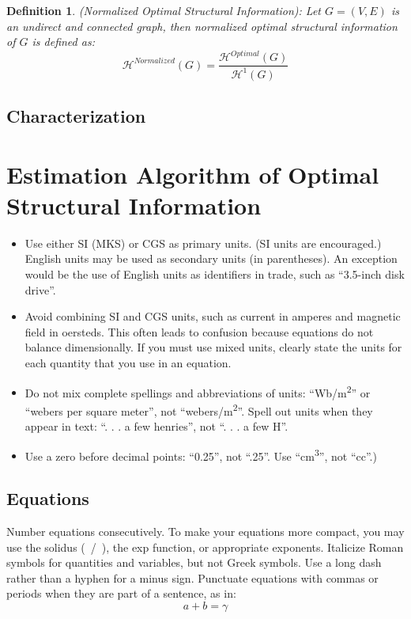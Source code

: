 \documentclass[10pt, conference, letterpaper]{IEEEtran}
\newtheorem{definition}{Definition}
\begin{document}
\begin{definition}
	(Normalized Optimal Structural Information): Let $G=(V,E)$ is an undirect and connected graph, then normalized optimal structural information of $G$ is defined as:
	\begin{equation}
	\label{eq:normalized_optimal_information}
	\mathcal{H}^{Normalized}(G)=\frac{\mathcal{H}^{Optimal}(G)}{\mathcal{H}^{1}(G)}
	\end{equation} 
\end{definition}

\subsection{Characterization}


\section{Estimation Algorithm of Optimal Structural Information}


\begin{itemize}
\item Use either SI (MKS) or CGS as primary units. (SI units are encouraged.) English units may be used as secondary units (in parentheses). An exception would be the use of English units as identifiers in trade, such as ``3.5-inch disk drive''.
\item Avoid combining SI and CGS units, such as current in amperes and magnetic field in oersteds. This often leads to confusion because equations do not balance dimensionally. If you must use mixed units, clearly state the units for each quantity that you use in an equation.
\item Do not mix complete spellings and abbreviations of units: ``Wb/m\textsuperscript{2}'' or ``webers per square meter'', not ``webers/m\textsuperscript{2}''. Spell out units when they appear in text: ``. . . a few henries'', not ``. . . a few H''.
\item Use a zero before decimal points: ``0.25'', not ``.25''. Use ``cm\textsuperscript{3}'', not ``cc''.)
\end{itemize}

\subsection{Equations}
Number equations consecutively. To make your 
equations more compact, you may use the solidus (~/~), the exp function, or 
appropriate exponents. Italicize Roman symbols for quantities and variables, 
but not Greek symbols. Use a long dash rather than a hyphen for a minus 
sign. Punctuate equations with commas or periods when they are part of a 
sentence, as in:
\begin{equation}
a+b=\gamma\label{eq}
\end{equation}
\end{document}
